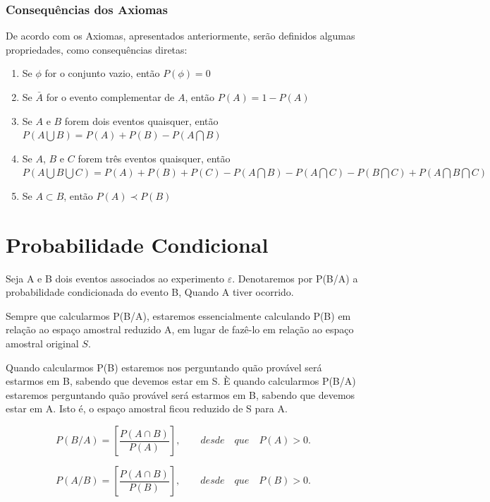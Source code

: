 \subsubsection{Consequências dos Axiomas}

De acordo com os Axiomas, apresentados anteriormente, serão definidos algumas propriedades, como consequências diretas:

\begin{enumerate}
\item Se $\phi$ for o conjunto vazio, então $P(\phi)=0$
\item Se $\bar{A}$ for o evento complementar de $A$, então $P(A)=1-P(A)$
\item Se $A$ e $B$ forem dois eventos quaisquer, então $P(A \bigcup B)= P(A)+P(B)-P(A \bigcap B)$ 
\item Se $A$, $B$ e $C$ forem três eventos quaisquer, então $P(A \bigcup B \bigcup C)= P(A)+P(B)+P(C)- P(A \bigcap B)- P(A \bigcap C)- P(B \bigcap C)+P(A \bigcap B \bigcap C)$
\item Se $A \subset B$, então $P(A) \prec P(B)$
\end{enumerate}

\section{Probabilidade Condicional}

Seja A e B dois eventos associados ao experimento $\varepsilon$.
Denotaremos por P(B/A) a probabilidade condicionada do evento B,
Quando A tiver ocorrido.\vskip0.3cm

Sempre que calcularmos P(B/A), estaremos essencialmente calculando
P(B) em relação ao espaço amostral reduzido A, em lugar de fazê-lo
em relação ao espaço amostral original $S$.\vskip0.3cm

Quando calcularmos P(B) estaremos nos perguntando quão provável
será estarmos em B, sabendo que devemos estar em S. È quando
calcularmos P(B/A) estaremos perguntando quão provável será
estarmos em B, sabendo que devemos estar em A. Isto é, o espaço
amostral ficou reduzido de S para A.


\begin{equation}\label{}
    P(B/A) = \left[ \frac{P(A \cap B)}{P(A)} \right], \quad \quad desde \quad que
    \quad P(A)>0.
\end{equation}

\begin{equation}\label{}
    P(A/B) = \left[ \frac{P(A \cap B)}{P(B)} \right], \quad \quad desde \quad que
    \quad P(B)>0.
\end{equation}

